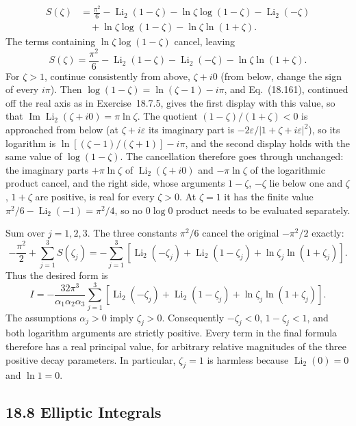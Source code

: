 \begin{align*}
S(\zeta)&=\frac{\pi^2}{6}-\operatorname{Li}_2(1-\zeta)
 -\ln\zeta\log(1-\zeta)-\operatorname{Li}_2(-\zeta)\\
&\quad+\ln\zeta\log(1-\zeta)-\ln\zeta\ln(1+\zeta).
\end{align*}
The terms containing $\ln\zeta\log(1-\zeta)$ cancel, leaving
\[
S(\zeta)=\frac{\pi^2}{6}
 -\operatorname{Li}_2(1-\zeta)-\operatorname{Li}_2(-\zeta)
 -\ln\zeta\ln(1+\zeta).
\]
For $\zeta>1$, continue consistently from above, $\zeta+i0$
(from below, change the sign of every $i\pi$).  Then
$\log(1-\zeta)=\ln(\zeta-1)-i\pi$, and Eq.~(18.161), continued off
the real axis as in Exercise~18.7.5, gives the first display with
this value, so that
$\operatorname{Im}\operatorname{Li}_2(\zeta+i0)=\pi\ln\zeta$.
The quotient $(1-\zeta)/(1+\zeta)<0$ is approached from below
(at $\zeta+i\varepsilon$ its imaginary part is
$-2\varepsilon/|1+\zeta+i\varepsilon|^2$), so its logarithm is
$\ln[(\zeta-1)/(\zeta+1)]-i\pi$, and the second display holds
with the same value of $\log(1-\zeta)$.  The cancellation
therefore goes through unchanged: the imaginary parts
$+\pi\ln\zeta$ of $\operatorname{Li}_2(\zeta+i0)$ and
$-\pi\ln\zeta$ of the logarithmic product cancel, and the right
side, whose arguments $1-\zeta$, $-\zeta$ lie below one and
$\zeta$, $1+\zeta$ are positive, is real for every $\zeta>0$.
At $\zeta=1$ it has the finite value
$\pi^2/6-\operatorname{Li}_2(-1)=\pi^2/4$, so no $0\log0$ product
needs to be evaluated separately.

Sum over $j=1,2,3$.  The three constants $\pi^2/6$ cancel
the original $-\pi^2/2$ exactly:
\[
-\frac{\pi^2}2+\sum_{j=1}^3S(\zeta_j)
 =-\sum_{j=1}^3\left[\operatorname{Li}_2(-\zeta_j)
 +\operatorname{Li}_2(1-\zeta_j)+\ln\zeta_j\ln(1+\zeta_j)\right].
\]
Thus the desired form is
\[
\boxed{I=-\frac{32\pi^3}{\alpha_1\alpha_2\alpha_3}
 \sum_{j=1}^3\left[
 \operatorname{Li}_2(-\zeta_j)+\operatorname{Li}_2(1-\zeta_j)
 +\ln\zeta_j\ln(1+\zeta_j)\right]}.
\]
The assumptions $\alpha_j>0$ imply $\zeta_j>0$.
Consequently $-\zeta_j<0$, $1-\zeta_j<1$, and both logarithm
arguments are strictly positive.  Every term in the final formula
therefore has a real principal value, for arbitrary relative
magnitudes of the three positive decay parameters.  In particular,
$\zeta_j=1$ is harmless because $\operatorname{Li}_2(0)=0$
and $\ln1=0$.

\subsection*{18.8 Elliptic Integrals}

